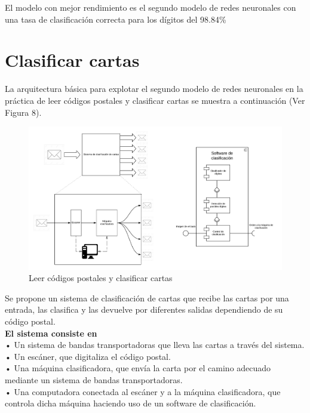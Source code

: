\documentclass{article}
\begin{document}
El modelo con mejor rendimiento es el segundo modelo de redes neuronales con una tasa de clasificación correcta para los dígitos del 98.84\%

\section{Clasificar cartas}

La arquitectura básica para explotar el segundo modelo de redes neuronales en la práctica de leer
códigos postales y clasificar cartas se muestra a continuación (Ver Figura 8).


\begin{figure}[H]
  \centering
	\includegraphics[scale=0.52]{figure/cartas.png}
	\caption{Leer códigos postales y clasificar cartas}
\end{figure}


Se propone un sistema de clasificación de cartas que recibe las cartas por una entrada, las clasifica y las devuelve por diferentes salidas dependiendo de su código postal.\\

\textbf{El sistema consiste en}\\
•	Un sistema de bandas transportadoras que lleva las cartas a través del sistema.\\
•	Un escáner, que digitaliza el código postal.\\
•	Una máquina clasificadora, que envía la carta por el camino adecuado mediante un sistema de bandas transportadoras.\\
•	Una computadora conectada al escáner y a la máquina clasificadora, que controla dicha máquina haciendo uso de un software de clasificación.\\
\end{document}
